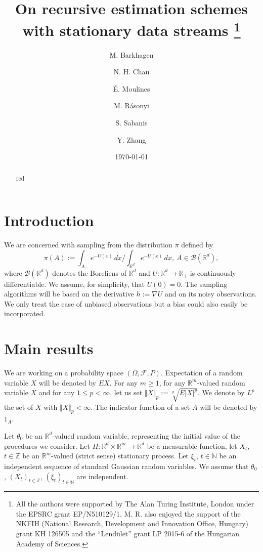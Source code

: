 \documentclass[a4paper,draft]{article}
\begin{document}
\title{On recursive estimation schemes\\ with stationary data streams
\thanks{All the authors
were supported
by The Alan Turing Institute, London under the EPSRC grant EP/N510129/1.
M. R. also enjoyed the support of the NKFIH (National Research, Development and Innovation Office, Hungary)
grant KH 126505 and the ``Lend\"ulet'' grant LP 2015-6 of the
Hungarian Academy of Sciences.}}

\author{M. Barkhagen \and N. H. Chau \and \'E. Moulines \and
M. R\'asonyi \and S. Sabanis \and Y. Zhang}

\date{\today}

\maketitle

\begin{abstract}
red
\end{abstract}

\section{Introduction}

We are concerned with sampling from the distribution $\pi$ defined by
$$
\pi(A):=\int_A e^{-U(x)}\, dx/\int_{\mathbb{R}^d} e^{-U(x)}\, dx,\
A\in\mathcal{B}(\mathbb{R}^d),
$$
where $\mathcal{B}(\mathbb{R}^d)$ denotes the Boreliens of $\mathbb{R}^d$
and $U:\mathbb{R}^d\to\mathbb{R}_+$ is continuously
differentiable. We assume, for simplicity,
that $U(0)=0$. The sampling algorithms will be based on
the derivative $h:=\nabla U$ and on its noisy observations.
We only treat the case of unbiased observations but a bias
could also easily be incorporated.

\section{Main results}

We are working on a probability space $(\Omega,\mathcal{F},P)$.
Expectation of
a random variable $X$ will be denoted by $EX$.
For any $m\geq 1$, for any $\mathbb{R}^m$-valued random variable $X$ and for any $1\leq p<\infty$, let us set
$\Vert X\Vert_p:=\sqrt[p]{E|X|^p}$. We denote by $L^p$ the set of $X$ with $\Vert X\Vert_p<\infty$.
The indicator function of a set $A$ will be denoted by $1_A$.


Let $\theta_0$ be an $\mathbb{R}^d$-valued random variable, representing
the initial value of the procedures we consider.
Let $H:\mathbb{R}^d\times\mathbb{R}^m\to\mathbb{R}^d$ be a measurable
function, let $X_t$, $t\in\mathbb{Z}$ be an $\mathbb{R}^m$-valued (strict sense) stationary process.
Let $\xi_t$, $t\in\mathbb{N}$ be an independent
sequence of standard Gaussian random variables. We assume that $\theta_0$, $(X_t)_{t\in\mathbb{Z}}$,
$(\xi_t)_{t\in\mathbb{N}}$ are independent.
\end{document}
